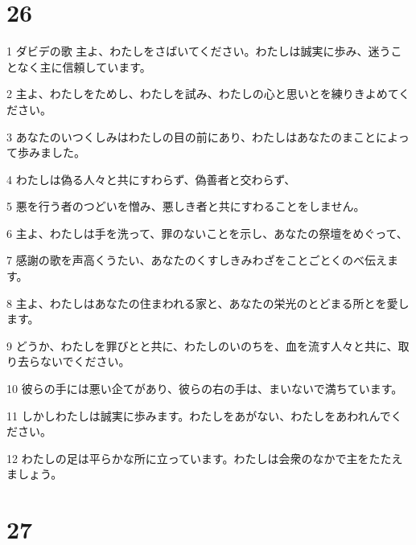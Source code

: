 \chapter{26}

\par 1 ダビデの歌 主よ、わたしをさばいてください。わたしは誠実に歩み、迷うことなく主に信頼しています。
\par 2 主よ、わたしをためし、わたしを試み、わたしの心と思いとを練りきよめてください。
\par 3 あなたのいつくしみはわたしの目の前にあり、わたしはあなたのまことによって歩みました。
\par 4 わたしは偽る人々と共にすわらず、偽善者と交わらず、
\par 5 悪を行う者のつどいを憎み、悪しき者と共にすわることをしません。
\par 6 主よ、わたしは手を洗って、罪のないことを示し、あなたの祭壇をめぐって、
\par 7 感謝の歌を声高くうたい、あなたのくすしきみわざをことごとくのべ伝えます。
\par 8 主よ、わたしはあなたの住まわれる家と、あなたの栄光のとどまる所とを愛します。
\par 9 どうか、わたしを罪びとと共に、わたしのいのちを、血を流す人々と共に、取り去らないでください。
\par 10 彼らの手には悪い企てがあり、彼らの右の手は、まいないで満ちています。
\par 11 しかしわたしは誠実に歩みます。わたしをあがない、わたしをあわれんでください。
\par 12 わたしの足は平らかな所に立っています。わたしは会衆のなかで主をたたえましょう。

\chapter{27}

